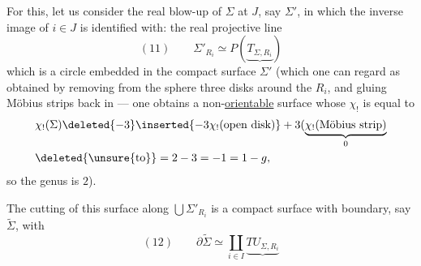 For this, let us consider the real blow-up of $\Sigma$ at $J$, say $\Sigma'$, in which the inverse image of $i\in J$ is identified with:  the real projective line
\[
(11)\qquad\Sigma'_{R_i}\simeq P(\underbrace{T_{\Sigma,R_i}})
\]
which is a circle embedded in the compact surface $\Sigma'$ (which one can regard as obtained by removing from the sphere three disks around the $R_i$, and gluing Möbius strips back in --- one obtains a non-\uline{orientable} surface whose  $\chi_!$ is equal to
\[
\begin{aligned}
&\chi_!(\Sigma)\deleted{-3}\inserted{-3\chi_!(\text{open disk})}+3(\underbrace{\chi_!(\text{Möbius strip})}_{0}\\
&\deleted{\unsure{\text{to}}}=2-3=-1=1-g,
\end{aligned}
\]
so the genus is $2$).

The cutting of this surface along $\bigcup\Sigma'_{R_i}$ is a compact surface with boundary,   say $\widetilde\Sigma$, with
\[
(12)\qquad\partial\widetilde\Sigma\simeq\coprod_{i\in I}\underbrace{TU_{\Sigma,R_i}}
\]
